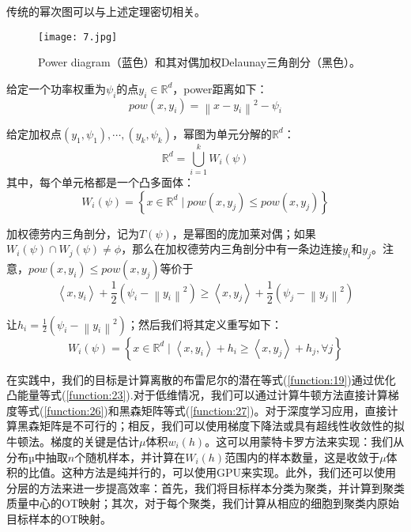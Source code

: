 传统的幂次图可以与上述定理密切相关。

\begin{figure}[h]
	\centering
	\texttt{[image: 7.jpg]}
	\caption{Power diagram（蓝色）和其对偶加权Delaunay三角剖分（黑色）。}
	\label{fig:7}
\end{figure}


\begin{definition}[power距离]\label{definition:4.1}
	给定一个功率权重为$\psi _i$的点$y_i \in \mathbb{R}^d$，power距离如下：
	\begin{equation}
		pow(x,y_i)=\left \| x-y_i \right \|^2 -\psi _i
		\label{function:28}
	\end{equation}
\end{definition}

\begin{definition}[power图]\label{definition:4.2}
	给定加权点$(y_1,\psi _1), \cdots , (y_k, \psi _k)$，幂图为单元分解的$\mathbb{R}^d$：
	\begin{equation}
		\mathbb{R}^d=\bigcup_{i=1}^{k} W_i(\psi) 
		\label{function:29}
	\end{equation}
	其中，每个单元格都是一个凸多面体：
	\begin{equation}
		W_i(\psi)=\left \{ x \in \mathbb{R}^d \mid pow(x,y_j) \le pow(x,y_j) \right \} 
		\label{function:30}
	\end{equation}
	
	加权德劳内三角剖分，记为$T(\psi)$，是幂图的庞加莱对偶；如果$W_i(\psi)\cap W_j(\psi) \ne \phi$，那么在加权德劳内三角剖分中有一条边连接$y_i$和$y_j$。注意，$pow(x,y_i) \le pow(x,y_j)$等价于
	\begin{equation}
		\left \langle x,y_i \right \rangle +\frac{1}{2} (\psi _i -\left \| y_i \right \|^2 ) \ge \left \langle x,y_j \right \rangle + \frac{1}{2} (\psi _j -\left \| y_j \right \|^2 )
		\label{function:31}
	\end{equation}

	让$h_i=\frac{1}{2} (\psi _i - \left \| y_i \right \|^2 )$；然后我们将其定义重写如下：
	\begin{equation}
		W_i(\psi)=\left \{ x \in \mathbb{R}^d \mid \left \langle x,y_i \right \rangle +h_i \ge \left \langle x,y_j \right \rangle +h_j , \forall j \right \} 
		\label{function:32}
	\end{equation}
\end{definition}

在实践中，我们的目标是计算离散的布雷尼尔的潜在等式(\ref{function:19})通过优化凸能量等式(\ref{function:23}).对于低维情况，我们可以通过计算牛顿方法直接计算梯度等式(\ref{function:26})和黑森矩阵等式(\ref{function:27})。对于深度学习应用，直接计算黑森矩阵是不可行的；相反，我们可以使用梯度下降法或具有超线性收敛性的拟牛顿法。梯度的关键是估计$\mu$体积$w_i(h)$。这可以用蒙特卡罗方法来实现：我们从分布$µ$中抽取$n$个随机样本，并计算在$W_i(h)$范围内的样本数量，这是收敛于$\mu$体积的比值。这种方法是纯并行的，可以使用GPU来实现。此外，我们还可以使用分层的方法来进一步提高效率：首先，我们将目标样本分类为聚类，并计算到聚类质量中心的OT映射；其次，对于每个聚类，我们计算从相应的细胞到聚类内原始目标样本的OT映射。

